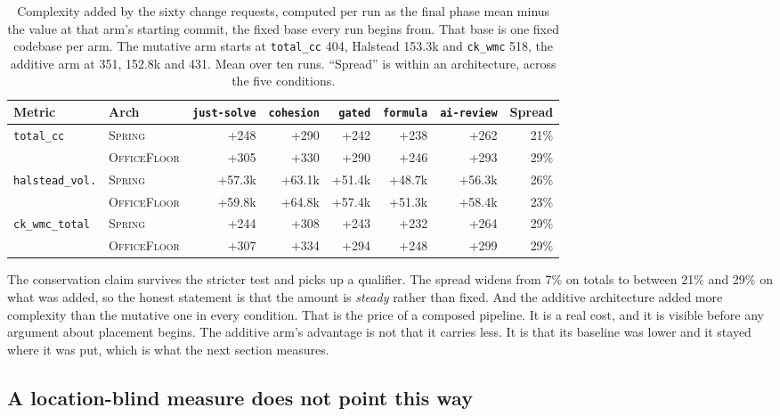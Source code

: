 \documentclass[11pt,a4paper]{article}
\newcommand{\sprg}{\textsc{Spring}}
\newcommand{\offl}{\textsc{OfficeFloor}}
\begin{document}
\begin{table}[t]
\centering
\caption{Complexity added by the sixty change requests, computed per run as the
final phase mean minus the value at that arm's starting commit, the fixed base
every run begins from. That base is one fixed codebase per arm. The mutative arm
starts at \texttt{total\_cc} 404, Halstead 153.3k and \texttt{ck\_wmc} 518, the
additive arm at 351, 152.8k and 431. Mean over ten runs. ``Spread'' is within an
architecture, across the five conditions.}
\label{tab:added}
\scriptsize
\setlength{\tabcolsep}{3.5pt}
\begin{tabular}{llrrrrrr}
\toprule
Metric & Arch & \texttt{just-solve} & \texttt{cohesion} & \texttt{gated} & \texttt{formula} & \texttt{ai-review} & Spread \\
\midrule
\texttt{total\_cc} & \sprg{} & +248 & +290 & +242 & +238 & +262 & 21\% \\
                   & \offl{} & +305 & +330 & +290 & +246 & +293 & 29\% \\
\addlinespace
\texttt{halstead\_vol.} & \sprg{} & +57.3k & +63.1k & +51.4k & +48.7k & +56.3k & 26\% \\
                          & \offl{} & +59.8k & +64.8k & +57.4k & +51.3k & +58.4k & 23\% \\
\addlinespace
\texttt{ck\_wmc\_total} & \sprg{} & +244 & +308 & +243 & +232 & +264 & 29\% \\
                        & \offl{} & +307 & +334 & +294 & +248 & +299 & 29\% \\
\bottomrule
\end{tabular}
\end{table}

The conservation claim survives the stricter test and picks up a qualifier. The
spread widens from 7\% on totals to between 21\% and 29\% on what was added, so
the honest statement is that the amount is \emph{steady} rather than fixed. And
the additive architecture added more complexity than the mutative one in every
condition. That is the price of a composed pipeline. It is a real cost, and it
is visible before any argument about placement begins. The additive arm's
advantage is not that it carries less. It is that its baseline was lower and it
stayed where it was put, which is what the next section measures.

\subsection{A location-blind measure does not point this way}
\label{sec:erosion}
\end{document}
